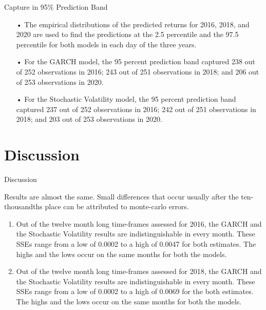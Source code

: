 \documentclass[11pt]{beamer}
\begin{document}
\begin{frame}{Capture in 95\% Prediction Band}
\begin{enumerate}
\item[•] The empirical distributions of the predicted returns for 2016, 2018, and 2020 are used to find the predictions at the 2.5 percentile and the 97.5 percentile for both models in each day of the three years. 
\item[•] For the GARCH model, the 95 percent prediction band captured 238 out of 252 observations in 2016; 243 out of 251 observations in 2018; and 206 out of 253 observations in 2020. 
\item[•] For the Stochastic Volatility model, the 95 percent prediction band captured 237 out of 252 observations in 2016; 242 out of 251 observations in 2018; and 203 out of 253 observations in 2020.
\end{enumerate}


\end{frame}


\section{Discussion}

\begin{frame}{Discussion}

Results are almost the same. Small differences that occur usually after the ten-thousandths place can be attributed to monte-carlo errors.

\begin{enumerate}
\item Out of the twelve month long time-frames assessed for 2016, the GARCH and the Stochastic Volatility results are indistinguishable in every month. These SSEs range from a low of 0.0002 to a high of 0.0047 for both estimates. The highs and the lows occur on the same months for both the models.

\item Out of the twelve month long time-frames assessed for 2018, the GARCH and the Stochastic Volatility results are indistinguishable in every month. These SSEs range from a low of 0.0002 to a high of 0.0069 for the both estimates. The highs and the lows occur on the same months for both the models.

\end{enumerate}

\end{frame}
\end{document}
